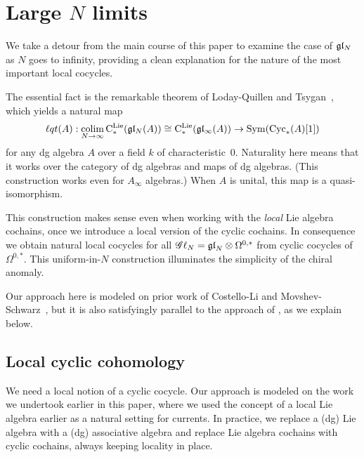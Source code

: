 \section{Large $N$ limits} \label{sec: largeN}


\def\cycls{{\rm Cyc}_*}
\def\lqt{{\ell q t}}
\def\colim{{\rm colim}}
\def\sl{\mathfrak{sl}}

We take a detour from the main course of this paper to examine the case of $\mathfrak{g} \mathfrak{l}_N$ as $N$ goes to infinity,
providing a clean explanation for the nature of the most important local cocycles.

The essential fact is the remarkable theorem of Loday-Quillen \cite{LQ} and Tsygan~\cite{Tsy},
which yields a natural map 
\[
\lqt(A) : \underset{N \to \infty}{\colim} \, \cliels(\gl_N(A)) \cong \cliels(\gl_\infty(A)) \to \Sym(\cycls(A)[1])
\]
for any dg algebra $A$ over a field $k$ of characteristic~0.
Naturality here means that it works over the category of dg algebras and maps of dg algebras.
(This construction works even for $A_\infty$ algebras.)
When $A$ is unital, this map is a quasi-isomorphism.

This construction makes sense even when working with the {\em local} Lie algebra cochains,
once we introduce a local version of the cyclic cochains.
In consequence we obtain natural local cocycles for all $\mathscr G \ell_{N} = {\mathfrak{gl}}_N \otimes \Omega^{0,*}$
from cyclic cocycles of $\Omega^{0,*}$.
This uniform-in-$N$ construction illuminates the simplicity of the chiral anomaly.

Our approach here is modeled on prior work of Costello-Li \cite{CLbcov2} and Movshev-Schwarz~\cite{MovSch},
but it is also satisfyingly parallel to the approach of \cite{FHK},
as we explain below.


\subsection{Local cyclic cohomology}

We need a local notion of a cyclic cocycle. 
Our approach is modeled on the work we undertook earlier in this paper,
where we used the concept of a local Lie algebra earlier as a natural setting for currents. 
In practice, we replace a (dg) Lie algebra with a (dg) associative algebra and replace Lie algebra cochains with cyclic cochains, 
always keeping locality in place.


